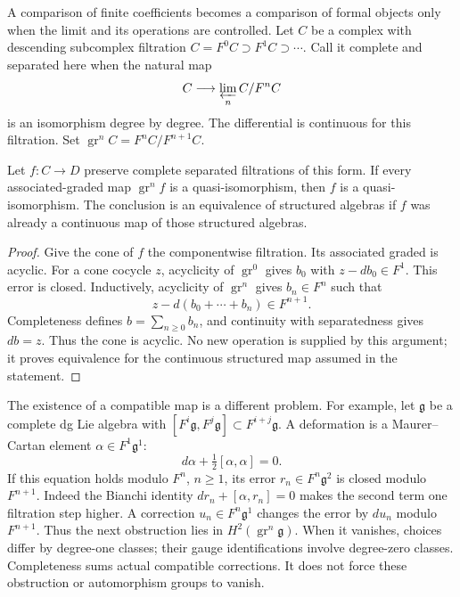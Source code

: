 A comparison of finite coefficients becomes a comparison of
formal objects only when the limit and its operations are
controlled. Let \(C\) be a complex with descending
subcomplex filtration
\(C=F^0C\supset F^1C\supset\cdots\).
Call it complete and separated here when the natural map
\[
 C\longrightarrow\varprojlim_n C/F^nC
\]
is an isomorphism degree by degree. The differential is
continuous for this filtration. Set
\(\operatorname{gr}^nC=F^nC/F^{n+1}C\).

\begin{lemma}\label{lem:vol2-complete-filtered-comparison}
Let \(f:C\to D\) preserve complete separated filtrations
of this form. If every associated-graded map
\(\operatorname{gr}^nf\) is a quasi-isomorphism, then \(f\)
is a quasi-isomorphism. The conclusion is an equivalence
of structured algebras if \(f\) was already a continuous
map of those structured algebras.
\end{lemma}
\begin{proof}
Give the cone of \(f\) the componentwise filtration. Its
associated graded is acyclic. For a cone cocycle \(z\),
acyclicity of \(\operatorname{gr}^0\) gives \(b_0\) with
\(z-db_0\in F^1\). This error is closed. Inductively,
acyclicity of \(\operatorname{gr}^n\) gives
\(b_n\in F^n\) such that
\[
 z-d(b_0+\cdots+b_n)\in F^{n+1}.
\]
Completeness defines \(b=\sum_{n\ge0}b_n\), and continuity
with separatedness gives \(db=z\). Thus the cone is
acyclic. No new operation is supplied by this argument;
it proves equivalence for the continuous structured map
assumed in the statement.
\end{proof}

The existence of a compatible map is a different problem.
For example, let \(\mathfrak g\) be a complete dg Lie
algebra with
\([F^i\mathfrak g,F^j\mathfrak g]\subset F^{i+j}\mathfrak g\).
A deformation is a Maurer--Cartan element
\(\alpha\in F^1\mathfrak g^1\):
\[
 d\alpha+\tfrac12[\alpha,\alpha]=0.
\]
If this equation holds modulo \(F^n\), \(n\ge1\), its error
\(r_n\in F^n\mathfrak g^2\) is closed modulo \(F^{n+1}\).
Indeed the Bianchi identity
\(dr_n+[\alpha,r_n]=0\) makes the second term one
filtration step higher. A correction \(u_n\in F^n\mathfrak g^1\)
changes the error by \(du_n\) modulo \(F^{n+1}\).
Thus the next obstruction lies in
\(H^2(\operatorname{gr}^n\mathfrak g)\). When it vanishes,
choices differ by degree-one classes; their gauge
identifications involve degree-zero classes.
Completeness sums actual compatible corrections. It does
not force these obstruction or automorphism groups to vanish.

